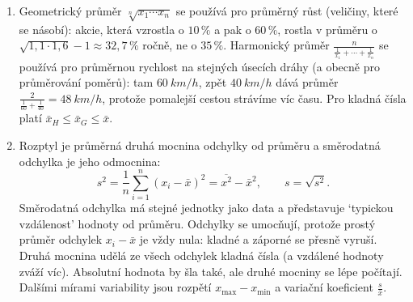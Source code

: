 \begin{enumerate}[label=\textbf{\arabic*.}, leftmargin=*, itemsep=0.8em]
  \item {}
  Geometrický průměr $\sqrt[n]{x_1\cdots x_n}$ se používá pro průměrný růst (veličiny, které se násobí): akcie, která vzrostla o $10\,\%$ a pak o $60\,\%$, rostla v průměru o $\sqrt{1{,}1\cdot 1{,}6} - 1\approx 32{,}7\,\%$ ročně, ne o $35\,\%$. Harmonický průměr $\frac{n}{\frac{1}{x_1} + \cdots + \frac{1}{x_n}}$ se používá pro průměrnou rychlost na stejných úsecích dráhy (a obecně pro průměrování poměrů): tam $60\ \si{km/h}$, zpět $40\ \si{km/h}$ dává průměr $\frac{2}{\frac{1}{60} + \frac{1}{40}} = 48\ \si{km/h}$, protože pomalejší cestou strávíme víc času. Pro kladná čísla platí $\bar{x}_H\leq\bar{x}_G\leq\bar{x}$. 

  \item {}
  Rozptyl je průměrná druhá mocnina odchylky od průměru a směrodatná odchylka je jeho odmocnina:
  \begin{equation*}
    s^2 = \frac{1}{n}\sum_{i=1}^{n}{(x_i - \bar{x})}^2 = \overline{x^2} - \bar{x}^2, \qquad s = \sqrt{s^2}.
  \end{equation*}
  Směrodatná odchylka má stejné jednotky jako data a představuje `typickou vzdálenost' hodnoty od průměru. Odchylky se umocňují, protože prostý průměr odchylek $x_i - \bar{x}$ je vždy nula: kladné a záporné se přesně vyruší. Druhá mocnina udělá ze všech odchylek kladná čísla (a vzdálené hodnoty zváží víc). Absolutní hodnota by šla také, ale druhé mocniny se lépe počítají. Dalšími mírami variability jsou rozpětí $x_{\max} - x_{\min}$ a variační koeficient $\frac{s}{\bar{x}}$. 


\end{enumerate}
